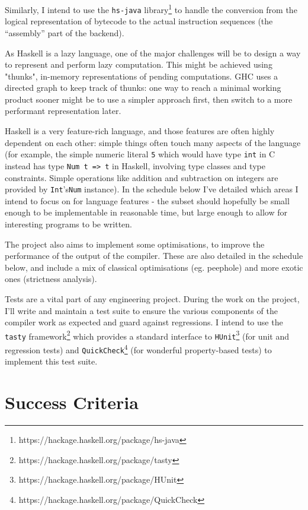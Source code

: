 \documentclass[12pt]{article}
\begin{document}
Similarly, I intend to use the \texttt{hs-java} library\footnote{https://hackage.haskell.org/package/hs-java}
to handle the conversion from the logical representation of bytecode to the actual instruction sequences (the
``assembly'' part of the backend).

As Haskell is a lazy language, one of the major challenges will be to design a way to represent and perform lazy
computation. This might be achieved using "thunks", in-memory representations of pending computations. GHC uses a
directed graph to keep track of thunks: one way to reach a minimal working product sooner might be to use a simpler
approach first, then switch to a more performant representation later.

Haskell is a very feature-rich language, and those features are often highly dependent on each other: simple things
often touch many aspects of the language (for example, the simple numeric literal \texttt{5} which would
have type \texttt{int} in C instead has type \texttt{Num t => t} in Haskell, involving type classes
and type constraints. Simple operations like addition and subtraction on integers are provided by
\texttt{Int}'s\texttt{Num} instance). In the schedule below I've detailed which areas I intend
to focus on for language features - the subset should hopefully be small enough to be implementable in reasonable time,
but large enough to allow for interesting programs to be written.

The project also aims to implement some optimisations, to improve the performance of the output of the compiler. These
are also detailed in the schedule below, and include a mix of classical optimisations (eg. peephole) and more exotic
ones (strictness analysis).

Tests are a vital part of any engineering project. During the work on the project, I'll write and maintain a test suite
to ensure the various components of the compiler work as expected and guard against regressions. I intend to use the
\texttt{tasty} framework\footnote{https://hackage.haskell.org/package/tasty} which provides a standard
interface to \texttt{HUnit}\footnote{https://hackage.haskell.org/package/HUnit} (for unit and regression
tests) and \texttt{QuickCheck}\footnote{https://hackage.haskell.org/package/QuickCheck} (for wonderful
property-based tests) to implement this test suite.


\section*{Success Criteria}
\end{document}
